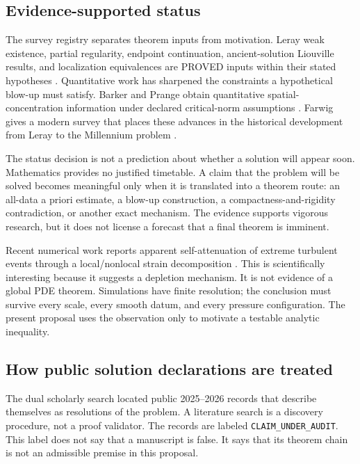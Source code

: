 \documentclass[conference]{../../../../Conference-LaTeX-template_10-17-19/IEEEtran}
\begin{document}
\subsection{Evidence-supported status}
The survey registry separates theorem inputs from motivation. Leray weak existence, partial regularity, endpoint continuation, ancient-solution Liouville results, and localization equivalences are PROVED inputs within their stated hypotheses \cite{leray,ckn,ess,knss,tao}. Quantitative work has sharpened the constraints a hypothetical blow-up must satisfy. Barker and Prange obtain quantitative spatial-concentration information under declared critical-norm assumptions \cite{barkerprange}. Farwig gives a modern survey that places these advances in the historical development from Leray to the Millennium problem \cite{farwig}.

The status decision is not a prediction about whether a solution will appear soon. Mathematics provides no justified timetable. A claim that the problem will be solved becomes meaningful only when it is translated into a theorem route: an all-data a priori estimate, a blow-up construction, a compactness-and-rigidity contradiction, or another exact mechanism. The evidence supports vigorous research, but it does not license a forecast that a final theorem is imminent.

Recent numerical work reports apparent self-attenuation of extreme turbulent events through a local/nonlocal strain decomposition \cite{buaria}. This is scientifically interesting because it suggests a depletion mechanism. It is not evidence of a global PDE theorem. Simulations have finite resolution; the conclusion must survive every scale, every smooth datum, and every pressure configuration. The present proposal uses the observation only to motivate a testable analytic inequality.

\subsection{How public solution declarations are treated}
The dual scholarly search located public 2025--2026 records that describe themselves as resolutions of the problem. A literature search is a discovery procedure, not a proof validator. The records are labeled \texttt{CLAIM\_UNDER\_AUDIT}. This label does not say that a manuscript is false. It says that its theorem chain is not an admissible premise in this proposal.
\end{document}
